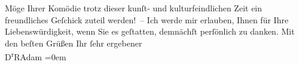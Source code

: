 \begin{ledgroupsized}[t]{13cm}
           \pstart
           Möge Ihrer Komödie trotz
               dieser kunſt- und kulturfeindlichen Zeit ein freundliches Geſchick zuteil
               werden! –\pend
           \pstart
           Ich werde mir erlauben, Ihnen für Ihre Liebenswürdigkeit, wenn Sie es geſtatten,
               demnächſt perſönlich zu danken.\pend
           \pstart
           Mit den beſten Grüßen Ihr ſehr ergebener{\\[\baselineskip]}\spacefill\mbox{D\textsuperscript{r}RAdam}\pend
           \leftskip=0em{}
         
         \endnumbering{}\end{ledgroupsized}  \newcommand{\dateiname}{L02220}\newcommand{\titel}{Robert Adam an Arthur Schnitzler, 21. 10. 1915}\newcommand{\editorInnen}{Martin Anton Müller und Gerd-Hermann Susen}
      
